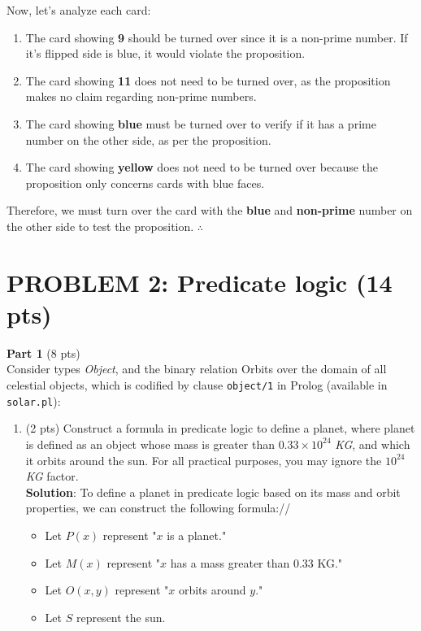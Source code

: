 \documentclass[12pt]{article}
\begin{document}
\begin{spacing}{1.5}
	Now, let's analyze each card:
	\begin{enumerate}
		\item The card showing \textbf{9} should be turned over since it is a non-prime number. If it's flipped side is blue, it would violate the proposition.
		\item The card showing \textbf{11} does not need to be turned over, as the proposition makes no claim regarding non-prime numbers.
		\item The card showing \textbf{blue} must be turned over to verify if it has a prime number on the other side, as per the proposition.
		\item The card showing \textbf{yellow} does not need to be turned over because the proposition only concerns cards with blue faces.\\
	\end{enumerate}
												
	Therefore, we must turn over the card with the \textbf{blue} and \textbf{non-prime} number on the other side to test the proposition. $\therefore$
												
	\newpage
												
								
	\newpage
							    
	\section*{PROBLEM 2: Predicate logic (14 pts)}
												
	\textbf{Part 1} (8 pts)\\
	Consider types \textit{Object}, and the binary relation Orbits over the domain of all celestial objects,
	which is codified by clause \texttt{object/1} in Prolog (available in \texttt{solar.pl}):
											
	\begin{enumerate}
		\item 
		      (2 pts) Construct a formula in predicate logic to define a planet, where planet is defined
		      as an object whose mass is greater than $0.33\times10^{24}$ \textit{KG}, and which it orbits around the
		      sun. For all practical purposes, you may ignore the $10^{24}$ \textit{KG} factor.\\

		      \textbf{Solution}: To define a planet in predicate logic based on its mass and orbit properties, we can construct the following formula://

		      \begin{itemize}
		      	\item Let $P(x)$ represent "$x$ is a planet."
		      	\item Let $M(x)$ represent "$x$ has a mass greater than 0.33 KG."
		      	\item Let $O(x,y)$ represent "$x$ orbits around $y$."
		      	\item Let $S$ represent the sun.
		      	      

\end{itemize}
\end{enumerate}
\end{spacing}
\end{document}
